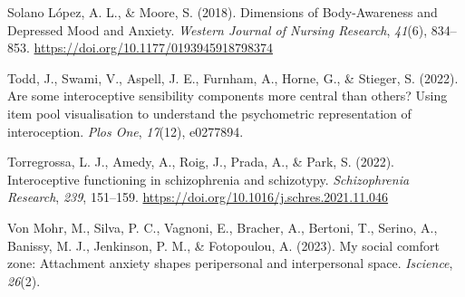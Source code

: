 \documentclass[
  man,
  floatsintext,
  longtable,
  nolmodern,
  notxfonts,
  notimes,
  colorlinks=true,linkcolor=blue,citecolor=blue,urlcolor=blue]{apa7}
\newlength{\cslhangindent}
\newenvironment{CSLReferences}[2] %
 {\begin{list}{}{%
  \setlength{\itemindent}{0pt}
  \setlength{\leftmargin}{0pt}
  \setlength{\parsep}{0pt}
  \ifodd #1
   \setlength{\leftmargin}{\cslhangindent}
   \setlength{\itemindent}{-1\cslhangindent}
  \fi
  \setlength{\itemsep}{#2\baselineskip}}}
 {\end{list}}
\begin{document}
\begin{CSLReferences}{1}{0}
Solano López, A. L., \& Moore, S. (2018). Dimensions of Body-Awareness
and Depressed Mood and Anxiety. \emph{Western Journal of Nursing
Research}, \emph{41}(6), 834--853.
\url{https://doi.org/10.1177/0193945918798374}

Todd, J., Swami, V., Aspell, J. E., Furnham, A., Horne, G., \& Stieger,
S. (2022). Are some interoceptive sensibility components more central
than others? Using item pool visualisation to understand the
psychometric representation of interoception. \emph{Plos One},
\emph{17}(12), e0277894.

Torregrossa, L. J., Amedy, A., Roig, J., Prada, A., \& Park, S. (2022).
Interoceptive functioning in schizophrenia and schizotypy.
\emph{Schizophrenia Research}, \emph{239}, 151--159.
\url{https://doi.org/10.1016/j.schres.2021.11.046}

Von Mohr, M., Silva, P. C., Vagnoni, E., Bracher, A., Bertoni, T.,
Serino, A., Banissy, M. J., Jenkinson, P. M., \& Fotopoulou, A. (2023).
My social comfort zone: Attachment anxiety shapes peripersonal and
interpersonal space. \emph{Iscience}, \emph{26}(2).

\end{CSLReferences}
\end{document}
